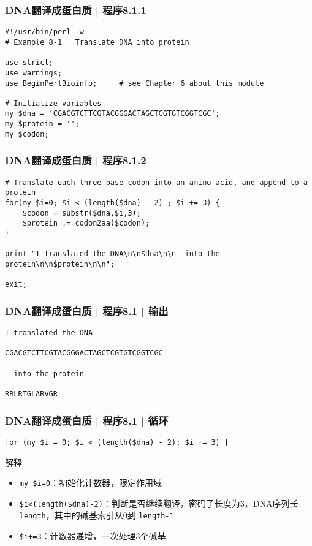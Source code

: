 \begin{frame}[fragile]
  \frametitle{DNA翻译成蛋白质 | 程序8.1.1}
\begin{lstlisting}[firstnumber=1]
#!/usr/bin/perl -w
# Example 8-1   Translate DNA into protein

use strict;
use warnings;
use BeginPerlBioinfo;     # see Chapter 6 about this module

# Initialize variables
my $dna = 'CGACGTCTTCGTACGGGACTAGCTCGTGTCGGTCGC';
my $protein = '';
my $codon;
\end{lstlisting}
\end{frame}

\begin{frame}[fragile]
  \frametitle{DNA翻译成蛋白质 | 程序8.1.2}
\begin{lstlisting}[firstnumber=13]
# Translate each three-base codon into an amino acid, and append to a protein 
for(my $i=0; $i < (length($dna) - 2) ; $i += 3) {
    $codon = substr($dna,$i,3);
    $protein .= codon2aa($codon);
}

print "I translated the DNA\n\n$dna\n\n  into the protein\n\n$protein\n\n";

exit;
\end{lstlisting}
\end{frame}

\begin{frame}[fragile]
  \frametitle{DNA翻译成蛋白质 | 程序8.1 | 输出}
\begin{lstlisting}
I translated the DNA

CGACGTCTTCGTACGGGACTAGCTCGTGTCGGTCGC

  into the protein

RRLRTGLARVGR
\end{lstlisting}
\end{frame}

\begin{frame}[fragile]
  \frametitle{DNA翻译成蛋白质 | 程序8.1 | \alert{循环}}
\begin{lstlisting}
for (my $i = 0; $i < (length($dna) - 2); $i += 3) {
\end{lstlisting}
\pause
\begin{block}{解释}
  \begin{itemize}
    \item \verb|my $i=0|：初始化计数器，限定作用域
    \item \verb|$i<(length($dna)-2)|：判断是否继续翻译，密码子长度为3，DNA序列长 \verb|length|，其中的碱基索引从0到 \verb|length-1|
    \item \verb|$i+=3|：计数器递增，一次处理3个碱基
  \end{itemize}
\end{block}
\end{frame}

